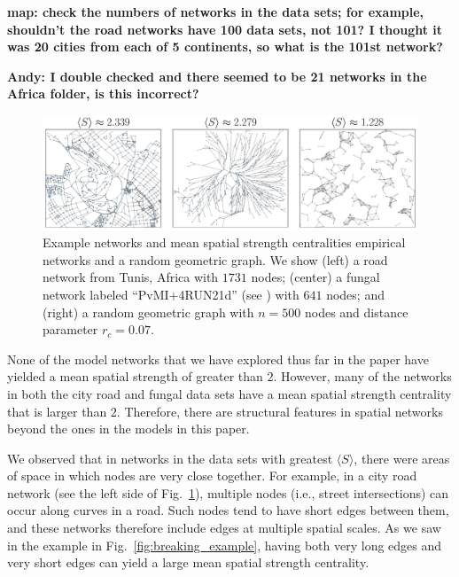 \documentclass[%
 reprint,
 amsmath,amssymb,
 aps,
]{revtex4-1}
\begin{document}
{\bf map: check the numbers of networks in the data sets; for example, shouldn't the road networks have 100 data sets, not 101? I thought it was 20 cities from each of 5 continents, so what is the 101st network?}

{\bf Andy: I double checked and there seemed to be 21 networks in the Africa folder, is this incorrect?}

\begin{figure}
    \centering
    \includegraphics[width=1.0\linewidth]{data_network_examples.pdf}
    \caption{Example networks and mean spatial strength centralities empirical networks and a random geometric graph. We show (left) a road network from Tunis, Africa with $1731$ nodes; (center) a fungal network labeled ``Pv\textunderscore M\textunderscore I+4R\textunderscore U\textunderscore N\textunderscore 21d'' (see \cite{fungal_data}) with $641$ nodes; and (right) a random geometric graph with $n = 500$ nodes and distance parameter $r_c = 0.07$.
    }
    \label{fig:data_network_examples}
\end{figure}


None of the model networks that we have explored thus far in the paper have yielded a mean spatial strength of greater than $2$.
 However, many of the networks in both the city road and fungal data sets have a mean spatial strength centrality that is larger than $2$. Therefore, there are structural features in spatial networks beyond the ones in the models in this paper.

{\color{red}We observed that in networks in the data sets with greatest $\langle S \rangle$, there were areas of space in which nodes are very close together.}
For example, in a city road network (see the left side of Fig.~\ref{fig:data_network_examples}), multiple nodes (i.e., street intersections) can occur along curves in a road. Such nodes tend to have short edges between them, and these networks therefore include edges at multiple spatial scales. As we saw in the example in Fig.~\ref{fig:breaking_example}, having both very long edges and very short edges can yield a large mean spatial strength centrality.
\end{document}
